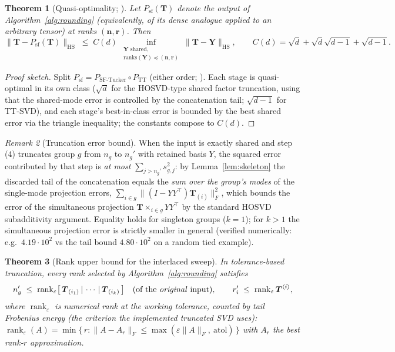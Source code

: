\documentclass[11pt]{article}
\newtheorem{theorem}{Theorem}[section]
\theoremstyle{definition}
\theoremstyle{remark}
\newtheorem{remark}[theorem]{Remark}
\newcommand{\T}{\boldsymbol{T}}
\newcommand{\rank}{\operatorname{rank}}
\newcommand{\HS}{\mathrm{HS}}
\begin{document}
\begin{theorem}[Quasi-optimality; {\cite[Thm.~2]{MR2026}}]\label{thm:quasi}
Let $P_{\mathrm{sf}}(\T)$ denote the output of
Algorithm~\ref{alg:rounding} (equivalently, of its dense analogue applied to
an arbitrary tensor) at ranks $(\boldsymbol{n}, \boldsymbol{r})$. Then
\[
\bigl\| \T - P_{\mathrm{sf}}(\T) \bigr\|_{\HS}
\;\leq\;
C(d)\,
\inf_{\substack{\boldsymbol{Y} \text{ shared},\\
\mathrm{ranks}(\boldsymbol{Y}) \preceq (\boldsymbol{n},\boldsymbol{r})}}
\bigl\| \T - \boldsymbol{Y} \bigr\|_{\HS},
\qquad
C(d) = \sqrt{d} + \sqrt{d}\sqrt{d-1} + \sqrt{d-1}.
\]
\end{theorem}

\begin{proof}[Proof sketch]
Split $P_{\mathrm{sf}} = P_{\mathrm{SF\text{-}Tucker}} \circ
P_{\mathrm{TT}}$ (either order; \cite[Rem.~1]{MR2026}). Each stage is
quasi-optimal in its own class ($\sqrt{d}$ for the HOSVD-type shared factor
truncation, using that the shared-mode error is controlled by the
concatenation tail; $\sqrt{d-1}$ for TT-SVD), and each stage's best-in-class
error is bounded by the best shared error via the triangle inequality; the
constants compose to $C(d)$.
\end{proof}

\begin{remark}[Truncation error bound]
When the input is exactly shared and step (4) truncates group $g$ from
$n_g$ to $n_g'$ with retained basis $Y$, the squared error contributed by
that step is \emph{at most} $\sum_{j > n_g'} s_{g,j}^2$: by
Lemma~\ref{lem:skeleton} the discarded tail of the concatenation equals the
\emph{sum over the group's modes} of the single-mode projection errors,
$\sum_{i \in g} \|(I - YY^\top)\T_{(i)}\|_F^2$, which bounds the error of the
simultaneous projection $\T \times_{i \in g} YY^\top$ by the standard
HOSVD subadditivity argument. Equality holds for singleton groups ($k=1$);
for $k > 1$ the simultaneous projection error is strictly smaller in general
(verified numerically: e.g.\ $4.19\cdot10^2$ vs the tail bound
$4.80\cdot10^2$ on a random tied example).
\end{remark}

\begin{theorem}[Rank upper bound for the interlaced sweep]\label{thm:rankbound}
In tolerance-based truncation, every rank selected by
Algorithm~\ref{alg:rounding} satisfies
\[
n_g' \;\leq\; \rank_\varepsilon
\bigl[\,\T_{(i_1)} \,|\, \cdots \,|\, \T_{(i_k)}\,\bigr]
\quad\text{(of the \emph{original} input)},
\qquad
r_i' \;\leq\; \rank_\varepsilon \T^{\langle i \rangle},
\]
where $\rank_\varepsilon$ is numerical rank at the working tolerance,
counted by tail Frobenius energy (the criterion the implemented truncated SVD
uses): $\rank_\varepsilon(A) = \min\{\, r :
\|A - A_r\|_F \le \max(\varepsilon \|A\|_F,\ \mathrm{atol}) \,\}$ with $A_r$
the best rank-$r$ approximation.
\end{theorem}
\end{document}
